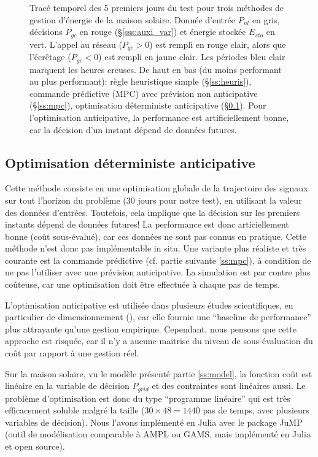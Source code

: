 \documentclass[a4paper,10pt,twocolumn]{article}
\begin{document}
\begin{figure}
  \caption{Tracé temporel des 5 premiers jours du test pour trois méthodes
  de gestion d'énergie de la maison solaire.
  Donnée d'entrée $P_{nl}$ en gris, décisions $P_{gc}$ en rouge (§\ref{sss:auxi_var})
  et énergie stockée $E_{sto}$ en vert.
  L'appel au réseau ($P_{gc}>0$) est rempli en rouge clair,
  alors que l'écrêtage ($P_{gc}<0$) est rempli en jaune clair.
  Les périodes bleu clair marquent les heures creuses.
  De haut en bas (du moins performant au plus performant):
  règle heuristique simple (§\ref{ss:heuris}),
  commande prédictive (MPC) avec prévision non anticipative (§\ref{ss:mpc}),
  optimisation déterministe anticipative (§\ref{ss:anticip}).
  Pour l'optimisation anticipative, la performance est artificiellement bonne,
  car la décision d'un instant dépend de données futures.
  }
  \label{fig:temporel}
\end{figure}

\subsection{Optimisation déterministe anticipative}
\label{ss:anticip}

Cette méthode consiste en une optimisation globale de la trajectoire des signaux
sur tout l'horizon du problème (30 jours pour notre test), en utilisant
la valeur des données d'entrées.
Toutefois, cela implique que la décision sur les premiers instants dépend
de données futures! La performance est donc articiellement bonne (coût sous-évalué),
car ces données ne sont pas connus en pratique.
Cette méthode n'est donc pas implémentable in situ.
Une variante plus réaliste et très courante est la commande prédictive
(cf. partie suivante \ref{ss:mpc}), à condition de ne pas l'utiliser
avec une prévision anticipative. La simulation est par contre plus coûteuse,
car une optimisation doit être effectuée à chaque pas de temps.

L'optimisation anticipative est utilisée dans plusieurs études scientifiques,
en particulier de dimensionnement (\cite{Rigo-Mariani:2014:SGE}),
car elle fournie une ``baseline de performance''
plus attrayante qu'une gestion empirique.
Cependant, nous pensons que cette approche est risquée, car il n'y a aucune maitrise
du niveau de sous-évaluation du coût par rapport à une gestion réel.

Sur la maison solaire, vu le modèle présenté partie \ref{ss:model},
la fonction coût est linéaire en la variable de décision $P_{grid}$
et des contraintes sont linéaires aussi.
Le problème d'optimisation est donc du type ``programme linéaire''
qui est très efficacement soluble malgré la taille
($30 \times 48 = 1440$ pas de temps, avec plusieurs variables de décision).
Nous l'avons implémenté en Julia avec le package JuMP\cite{Dunning:2017:JuMP}
(outil de modélisation comparable à AMPL ou GAMS, mais implémenté en Julia
et open source).
\end{document}
